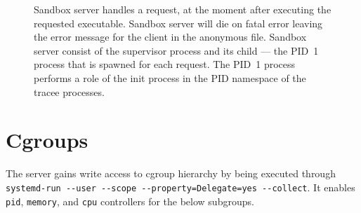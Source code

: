 \documentclass[en]{pracamgr}
\begin{document}
\begin{figure}[h]
\caption{Sandbox server handles a request, at the moment after executing the requested executable. Sandbox server will die on fatal error leaving the error message for the client in the anonymous file. Sandbox server consist of the supervisor process and its child --- the PID~1 process that is spawned for each request. The PID~1 process performs a role of the init process in the PID namespace of the tracee processes.}
\label{fig:server_handles_request_after_execve}
\end{figure}

\section{Cgroups}

The server gains write access to cgroup hierarchy by being executed through \texttt{systemd-run -{}-user -{}-scope -{}-property=Delegate=yes -{}-collect}. It enables \texttt{pid}, \texttt{memory}, and \texttt{cpu} controllers for the below subgroups.
\end{document}
